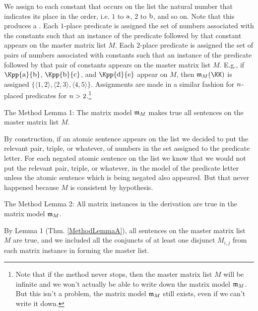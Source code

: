 We assign to each constant that occurs on the list the natural number that indicates its place in the order, i.e. $1$ to $\mathrm{a}$, $2$ to $\mathrm{b}$, and so on.
Note that this produces a .
Each $1$-place predicate is assigned the set of numbers associated with the constants such that an instance of the predicate followed by that constant appears on the master matrix list $M$. 
Each $2$-place predicate is assigned the set of pairs of numbers associated with constants such that an instance of the predicate followed by that pair of constants appears on the master matrix list $M$. 
E.g., if $\Kpp{\constant{a}}{\constant{b}}$, $\Kpp{\constant{b}}{\constant{c}}$, and $\Kpp{\constant{d}}{\constant{e}}$ appear on $M$, then $\IntA_M(\KK)$ is assigned $\{\langle1,2\rangle,\langle2,3\rangle,\langle4,5\rangle\}$.
Assignments are made in a similar fashion for $n$-placed predicates for $n>2$.\footnote{Note 
that if the method never stops, then the master matrix list $M$ will be infinite and we won't actually be able to write down the matrix model $\mathfrak{m}_M$. 
But this isn't a problem, the matrix model $\mathfrak{m}_M$ still exists, even if we can't write it down.} 
\begin{THEOREM}{ The Method Lemma 1:}
The matrix model $\mathfrak{m}_M$ makes true all sentences on the master matrix list $M$.
\end{THEOREM}
\begin{PROOF}
By construction, if an atomic sentence appears on the list we decided to put the relevant pair, triple, or whatever, of numbers in the set assigned to the predicate letter. 
For each negated atomic sentence on the list we know that we would not put the relevant pair, triple, or whatever, in the model of the predicate letter unless the atomic sentence which is being negated also appeared. 
But that never happened because $M$ is consistent by hypothesis.
\end{PROOF}
\begin{THEOREM}{ The Method Lemma 2:}
All matrix instances in the derivation are true in the matrix model $\mathfrak{m}_M$.
\end{THEOREM}
\begin{PROOF}
By Lemma 1 (Thm. \ref{MethodLemmaA}), all sentences on the master matrix list $M$ are true, and we included all the conjuncts of at least one disjunct $M_{i,j}$ from each matrix instance in forming the master list.
\end{PROOF}
